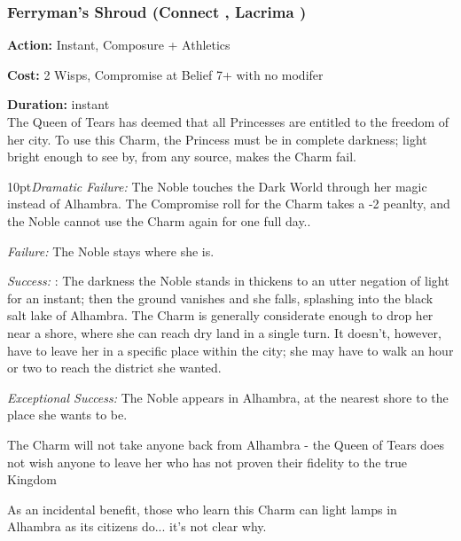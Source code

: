 \subsubsection*{Ferryman's Shroud (Connect \textbullet\textbullet\textbullet, Lacrima \textbullet)}

\noindent \textbf{Action:} Instant, Composure + Athletics

\noindent \textbf{Cost:} 2 Wisps, Compromise at Belief 7+ with no modifer

\noindent \textbf{Duration:} instant \\

\noindent The Queen of Tears has deemed that all Princesses are entitled to the freedom of her city. To use this Charm, the Princess must be in complete darkness; light bright enough to see by, from any source, makes the Charm fail. 

\begin{myindentpar}{10pt}\emph{Dramatic Failure:} The Noble touches the Dark World through her magic instead of Alhambra. The Compromise roll for the Charm takes a -2 peanlty, and the Noble cannot use the Charm again for one full day..
    
	\emph{Failure:} The Noble stays where she is.
    
	\emph{Success:} : The darkness the Noble stands in thickens to an utter negation of light for an instant; then the ground vanishes and she falls, splashing into the black salt lake of Alhambra. The Charm is generally considerate enough to drop her near a shore, where she can reach dry land in a single turn. It doesn’t, however, have to leave her in a specific place within the city; she may have to walk an hour or two to reach the district she wanted.
    
	\emph{Exceptional Success:} The Noble appears in Alhambra, at the nearest shore to the place she wants to be.\end{myindentpar}
	
\noindent The Charm will not take anyone back from Alhambra - the Queen of Tears does not wish anyone to leave her who has not proven their fidelity to the true Kingdom

As an incidental benefit, those who learn this Charm can light lamps in Alhambra as its citizens do... it's not clear why. 


